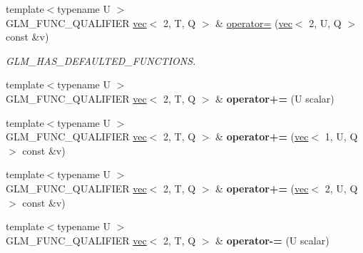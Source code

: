 \begin{DoxyCompactItemize}
\item 
\mbox{\label{structglm_1_1vec_3_012_00_01T_00_01Q_01_4_a2775461653654240913b4d7ad3104384}} 
{\footnotesize template$<$typename U $>$ }\\G\+L\+M\+\_\+\+F\+U\+N\+C\+\_\+\+Q\+U\+A\+L\+I\+F\+I\+ER \hyperlink{structglm_1_1vec}{vec}$<$ 2, T, Q $>$ \& \hyperlink{structglm_1_1vec_3_012_00_01T_00_01Q_01_4_a2775461653654240913b4d7ad3104384}{operator=} (\hyperlink{structglm_1_1vec}{vec}$<$ 2, U, Q $>$ const \&v)
\begin{DoxyCompactList}\small\item\em G\+L\+M\+\_\+\+H\+A\+S\+\_\+\+D\+E\+F\+A\+U\+L\+T\+E\+D\+\_\+\+F\+U\+N\+C\+T\+I\+O\+NS. \end{DoxyCompactList}\item 
\mbox{\label{structglm_1_1vec_3_012_00_01T_00_01Q_01_4_a85009f198924c17e5830290e55c04323}} 
{\footnotesize template$<$typename U $>$ }\\G\+L\+M\+\_\+\+F\+U\+N\+C\+\_\+\+Q\+U\+A\+L\+I\+F\+I\+ER \hyperlink{structglm_1_1vec}{vec}$<$ 2, T, Q $>$ \& {\bfseries operator+=} (U scalar)
\item 
\mbox{\label{structglm_1_1vec_3_012_00_01T_00_01Q_01_4_a5a24f12fc3b14e67842a4759cdca08b2}} 
{\footnotesize template$<$typename U $>$ }\\G\+L\+M\+\_\+\+F\+U\+N\+C\+\_\+\+Q\+U\+A\+L\+I\+F\+I\+ER \hyperlink{structglm_1_1vec}{vec}$<$ 2, T, Q $>$ \& {\bfseries operator+=} (\hyperlink{structglm_1_1vec}{vec}$<$ 1, U, Q $>$ const \&v)
\item 
\mbox{\label{structglm_1_1vec_3_012_00_01T_00_01Q_01_4_aeddb35c29290a573a8e33b70c2bb5cd8}} 
{\footnotesize template$<$typename U $>$ }\\G\+L\+M\+\_\+\+F\+U\+N\+C\+\_\+\+Q\+U\+A\+L\+I\+F\+I\+ER \hyperlink{structglm_1_1vec}{vec}$<$ 2, T, Q $>$ \& {\bfseries operator+=} (\hyperlink{structglm_1_1vec}{vec}$<$ 2, U, Q $>$ const \&v)
\item 
\mbox{\label{structglm_1_1vec_3_012_00_01T_00_01Q_01_4_a55b50722876c56ed99f91322a5f9a5b4}} 
{\footnotesize template$<$typename U $>$ }\\G\+L\+M\+\_\+\+F\+U\+N\+C\+\_\+\+Q\+U\+A\+L\+I\+F\+I\+ER \hyperlink{structglm_1_1vec}{vec}$<$ 2, T, Q $>$ \& {\bfseries operator-\/=} (U scalar)

\end{DoxyCompactItemize}
